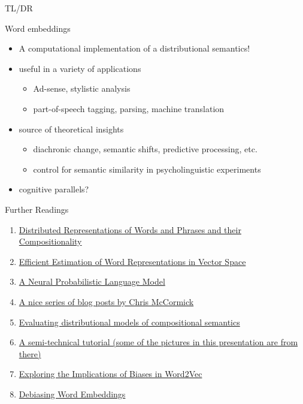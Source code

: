 \documentclass[professionalfonts, xcolor={usenames,svgnames,x11names,table}]{beamer}
\begin{document}
\begin{frame}{TL/DR}
\begin{block}{Word embeddings}
\begin{itemize}
\item A computational implementation of a \alert{distributional semantics}!
\end{itemize}
\end{block}
\begin{itemize}
\item useful in a variety of applications
\begin{itemize}
\item Ad-sense, stylistic analysis
\item part-of-speech tagging, parsing, machine translation
\end{itemize}
\item source of theoretical insights
\begin{itemize}
\item diachronic change, semantic shifts, predictive processing, etc.
\item control for semantic similarity in psycholinguistic experiments
\end{itemize}
\item cognitive parallels?
\end{itemize}
\vspace{0.3cm}
\end{frame}

\begin{frame}{Further Readings}
\begin{enumerate}
\item \href{https://papers.nips.cc/paper/5021-distributed-representations-of-words-and-phrases-and-their-compositionality.pdf}{Distributed Representations of Words and Phrases and their Compositionality}
\item \href{https://arxiv.org/pdf/1301.3781.pdf}{Efficient Estimation of Word Representations in Vector Space}
\item \href{http://www.jmlr.org/papers/volume3/bengio03a/bengio03a.pdf}{A Neural Probabilistic Language Model}
\item \href{http://mccormickml.com/}{A nice series of blog posts by Chris McCormick}
\item \href{http://sro.sussex.ac.uk/id/eprint/61062/1/Batchkarov,\%20Miroslav\%20Manov.pdf}{Evaluating distributional models of compositional semantics}
\item  \href{https://israelg99.github.io/2017-03-23-Word2Vec-Explained/}{A semi-technical tutorial (some of the pictures in this presentation are from there)}
\item \href{http://www.mattkenney.me/google-word2vec-biases/}{Exploring the Implications of Biases in Word2Vec}
\item \href{https://arxiv.org/pdf/1607.06520.pdf}{Debiasing Word Embeddings}
\end{enumerate}
\end{frame}
\end{document}
